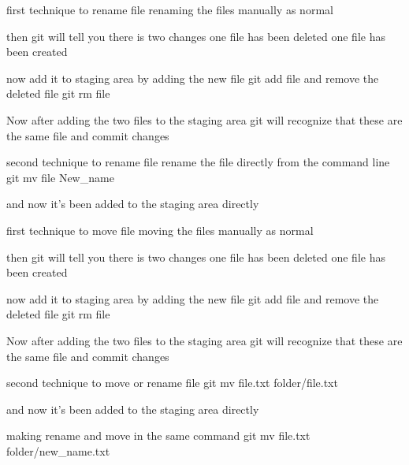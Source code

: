 first technique to rename file
  renaming the files manually as normal 

  then git will tell you there is two changes 
  one file has been deleted 
  one file has been created 

  now add it to staging area 
  by adding the new file           git add file
  and remove the deleted file      git rm file 

  Now after adding the two files to the staging area 
  git will recognize that these are the same file  
  and commit changes 

second technique to rename file
  rename the file directly from the command line 
  git mv file New_name 

  and now it's been added to the staging area directly 


first technique to move file
  moving the files manually as normal 

  then git will tell you there is two changes 
  one file has been deleted 
  one file has been created 

  now add it to staging area 
  by adding the new file           git add file
  and remove the deleted file      git rm file 

  Now after adding the two files to the staging area 
  git will recognize that these are the same file  
  and commit changes 


second technique to move or rename file
  git mv file.txt folder/file.txt

  and now it's been added to the staging area directly 

making rename and move in the same command 
    git mv file.txt folder/new_name.txt
